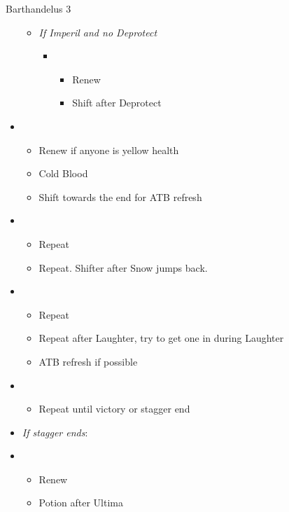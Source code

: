 \begin{battle}[1:24]{Barthandelus 3}
\begin{itemize}
\begin{itemize}
\begin{itemize}
				            \end{itemize}
				      \item \textit{If Imperil and no Deprotect}
				            \begin{itemize}
					            \item \fifth
					                  \begin{itemize}
						                  \item Renew
						                  \item Shift after Deprotect
					                  \end{itemize}
				            \end{itemize}
			      \end{itemize}
			\item \sixth
			      \begin{itemize}
				      \item Renew if anyone is yellow health
				      \item Cold Blood
				      \item Shift towards the end for ATB refresh
			      \end{itemize}
			\item \second
			      \begin{itemize}
				      \item Repeat
				      \item Repeat. Shifter after Snow jumps back.
			      \end{itemize}
			\item \first
			      \begin{itemize}
				      \item Repeat
				      \item Repeat after Laughter, try to get one in during Laughter
				      \item ATB refresh if possible
			      \end{itemize}
			\item \second
			      \begin{itemize}
				      \item Repeat until victory or stagger end
			      \end{itemize}
			\item \textit{If stagger ends}:
			\item \third
			      \begin{itemize}
				      \item Renew
				      \item Potion after Ultima
			      \end{itemize}

\end{itemize}
\end{battle}
